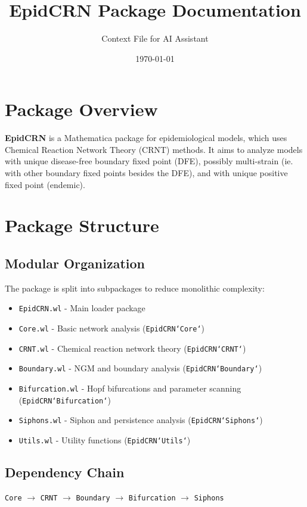 \documentclass{article}
\title{EpidCRN Package Documentation}
\author{Context File for AI Assistant}
\date{\today}
\begin{document}
\maketitle

\section{Package Overview}

\textbf{EpidCRN} is a Mathematica package for epidemiological models, which uses Chemical Reaction Network Theory (CRNT) methods. It  aims to analyze  models with unique disease-free boundary fixed point (DFE), possibly  multi-strain (ie. with other boundary fixed points besides the DFE), and with unique positive fixed point (endemic).

\section{Package Structure}

\subsection{Modular Organization}
The package is split into subpackages to reduce monolithic complexity:

\begin{itemize}
\item \texttt{EpidCRN.wl} - Main loader package
\item \texttt{Core.wl} - Basic network analysis (\texttt{EpidCRN`Core`})
\item \texttt{CRNT.wl} - Chemical reaction network theory (\texttt{EpidCRN`CRNT`})
\item \texttt{Boundary.wl} - NGM and boundary analysis (\texttt{EpidCRN`Boundary`})
\item \texttt{Bifurcation.wl} - Hopf bifurcations and parameter scanning (\texttt{EpidCRN`Bifurcation`})
\item \texttt{Siphons.wl} - Siphon and persistence analysis (\texttt{EpidCRN`Siphons`})
\item \texttt{Utils.wl} - Utility functions (\texttt{EpidCRN`Utils`})
\end{itemize}

\subsection{Dependency Chain}
\texttt{Core} $\rightarrow$ \texttt{CRNT} $\rightarrow$ \texttt{Boundary} $\rightarrow$ \texttt{Bifurcation} $\rightarrow$ \texttt{Siphons}
\end{document}
